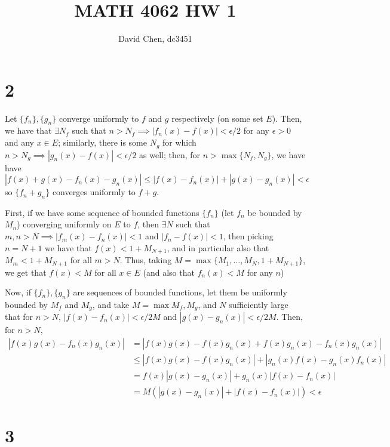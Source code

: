 \documentclass[12pt,letterpaper]{article}
\title{MATH 4062 HW 1}
\author{David Chen, dc3451}
\theoremstyle{definition}
\begin{document}
\maketitle

\section*{2}

Let $\{f_{n}\}, \{g_{n}\}$ converge uniformly to $f$ and $g$ respectively (on some set $E$). Then, we have that $\exists N_{f}$ such that $n > N_{f} \implies |f_{n}(x) - f(x)| < \epsilon/2$ for any $\epsilon > 0$ and any $x \in E$; similarly, there is some $N_{g}$ for which $n > N_{g} \implies |g_{n}(x) - f(x)| <\epsilon/2$ as well; then, for $n > \max\{N_{f}, N_{g}\}$, we have have
\[
  |f(x) + g(x) - f_{n}(x) - g_{n}(x)| \leq |f(x) - f_{n}(x)| + |g(x) - g_{n}(x)| < \epsilon
\]
so $\{f_{n} + g_{n}\}$ converges uniformly to $f + g$.

First, if we have some sequence of bounded functions $\{f_{n}\}$ (let $f_{n}$ be bounded by $M_{n}$) converging uniformly on $E$ to $f$, then $\exists N$ such that $m,n > N \implies |f_{m}(x) - f_{n}(x)| < 1$ and $|f_{n} - f(x)| < 1$, then picking $n = N + 1$ we have that $f(x) < 1 + M_{N+1}$, and in particular also that $M_{m} < 1 + M_{N + 1}$ for all $m > N$. Thus, taking $M = \max\{M_{1}, \dots, M_{N}, 1 + M_{N+1}\}$, we get that $f(x) < M$ for all $x \in E$ (and also that $f_{n}(x) < M$ for any $n$)

Now, if $\{f_{n}\}, \{g_{n}\}$ are sequences of bounded functions, let them be uniformly bounded by $M_{f}$ and $M_{g}$, and take $M = \max{M_{f}, M_{g}}$, and $N$ sufficiently large that for $n > N$, $|f(x) - f_{n}(x)| < \epsilon/2M$ and $|g(x) - g_{n}(x)| < \epsilon/2M$. Then, for $n > N$,
\begin{align*}
  |f(x)g(x) - f_{n}(x)g_{n}(x)| &= |f(x)g(x) - f(x)g_{n}(x) + f(x)g_{n}(x) - f_{n}(x)g_{n}(x)| \\
                                &\leq |f(x)g(x) - f(x)g_{n}(x)| + |g_{n}(x)f(x) - g_{n}(x)f_{n}(x)| \\
                                &= f(x)|g(x) - g_{n}(x)| + g_{n}(x)|f(x) - f_{n}(x)| \\
                                &= M(|g(x) - g_{n}(x)| + |f(x) - f_{n}(x)|) < \epsilon
\end{align*}

\section*{3}
\end{document}
